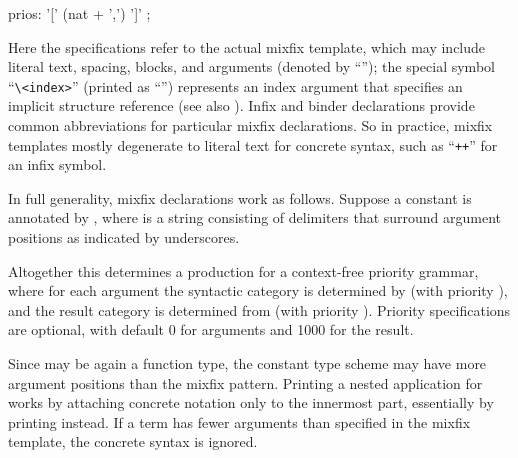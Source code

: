 \begin{isabellebody}
\begin{isamarkuptext}
\begin{rail}
    prios: '[' (nat + ',') ']'
    ;
  \end{rail}

  Here the  specifications refer to the actual mixfix
  template, which may include literal text, spacing, blocks, and
  arguments (denoted by ``\isa{{\isacharunderscore}}''); the special symbol
  ``\verb|\<index>|'' (printed as ``\isa{{\isachardoublequote}{\isasymindex}{\isachardoublequote}}'') represents an index
  argument that specifies an implicit structure reference (see also
  ).  Infix and binder declarations provide common
  abbreviations for particular mixfix declarations.  So in practice,
  mixfix templates mostly degenerate to literal text for concrete
  syntax, such as ``\verb|++|'' for an infix symbol.

  \medskip In full generality, mixfix declarations work as follows.
  Suppose a constant  is
  annotated by , where  is a string  consisting of
  delimiters that surround argument positions as indicated by
  underscores.

  Altogether this determines a production for a context-free priority
  grammar, where for each argument  the syntactic category
  is determined by  (with priority ), and
  the result category is determined from \isa{{\isachardoublequote}{\isasymtau}{\isachardoublequote}} (with
  priority ).  Priority specifications are optional, with
  default 0 for arguments and 1000 for the result.

  Since \isa{{\isachardoublequote}{\isasymtau}{\isachardoublequote}} may be again a function type, the constant
  type scheme may have more argument positions than the mixfix
  pattern.  Printing a nested application  for
   works by attaching concrete notation only to the
  innermost part, essentially by printing 
  instead.  If a term has fewer arguments than specified in the mixfix
  template, the concrete syntax is ignored.


\end{isamarkuptext}
\end{isabellebody}
